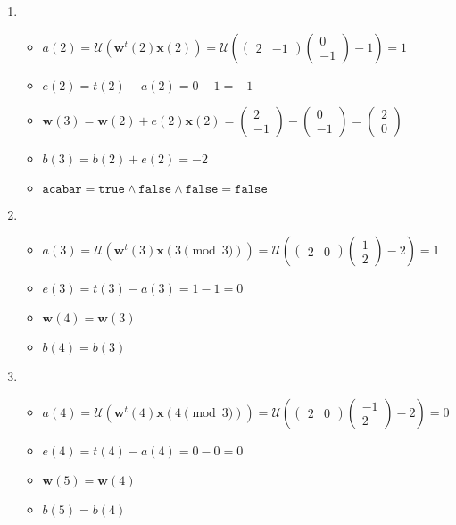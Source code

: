 \begin{enumerate}[label = \textbf{\arabic*. }]
			\item \begin{itemize}
				\item $a(2) = \mathcal{U}(\textbf{w}^t(2)\textbf{x}(2)) = \mathcal{U}\left(\begin{pmatrix}2 & -1\end{pmatrix}\begin{pmatrix}
					0\\-1 \end{pmatrix} -1\right) = 1$
				\item $e(2) = t(2) - a(2) = 0 - 1 = -1$
				\item $\textbf{w}(3) = \textbf{w}(2) + e(2)\textbf{x}(2) = \begin{pmatrix}2\\ -1\end{pmatrix} - \begin{pmatrix}0\\-1\end{pmatrix} = \begin{pmatrix}2\\ 0\end{pmatrix}$
				\item $b(3) = b(2) + e(2) = -2$
				\item $\texttt{acabar} = \texttt{true} \land \texttt{false} \land \texttt{false} = \texttt{false}$
			\end{itemize}
			
			\item \begin{itemize}
				\item $a(3) = \mathcal{U}(\textbf{w}^t(3)\textbf{x}(3\pmod{3})) = \mathcal{U}\left(\begin{pmatrix}2 & 0\end{pmatrix}\begin{pmatrix}
					1\\2 \end{pmatrix} -2\right) = 1$
				\item $e(3) = t(3) - a(3) = 1 - 1 = 0$
				\item $\textbf{w}(4) = \textbf{w}(3)$
				\item $b(4) = b(3)$
			\end{itemize}
			
			\item \begin{itemize}
				\item $a(4) = \mathcal{U}(\textbf{w}^t(4)\textbf{x}(4\pmod{3})) = \mathcal{U}\left(\begin{pmatrix}2 & 0\end{pmatrix}\begin{pmatrix}
					-1\\2 \end{pmatrix} -2\right) = 0$
				\item $e(4) = t(4) - a(4) = 0 - 0 = 0$
				\item $\textbf{w}(5) = \textbf{w}(4)$
				\item $b(5) = b(4)$
			\end{itemize}
			

\end{enumerate}
